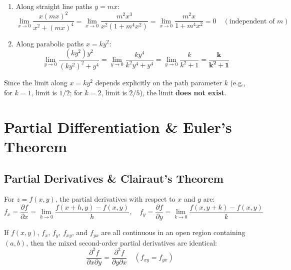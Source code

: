 \begin{solutionbox}
\begin{enumerate}
    \item Along straight line paths $y = mx$:
    \begin{equation*}
        \lim_{x\to 0} \frac{x (mx)^2}{x^2 + (mx)^4} = \lim_{x\to 0} \frac{m^2 x^3}{x^2(1 + m^4 x^2)} = \lim_{x\to 0} \frac{m^2 x}{1 + m^4 x^2} = 0 \quad (\text{independent of } m)
    \end{equation*}
    \item Along parabolic paths $x = k y^2$:
    \begin{equation*}
        \lim_{y\to 0} \frac{(ky^2)y^2}{(ky^2)^2 + y^4} = \lim_{y\to 0} \frac{k y^4}{k^2 y^4 + y^4} = \lim_{y\to 0} \frac{k}{k^2 + 1} = \mathbf{\frac{k}{k^2 + 1}}
    \end{equation*}
\end{enumerate}
Since the limit along $x = ky^2$ depends explicitly on the path parameter $k$ (e.g., for $k=1$, limit is $1/2$; for $k=2$, limit is $2/5$), the limit \textbf{does not exist}.
\end{solutionbox}

\section{Partial Differentiation \& Euler's Theorem}

\subsection{Partial Derivatives \& Clairaut's Theorem}

\begin{definition}
For $z = f(x,y)$, the partial derivatives with respect to $x$ and $y$ are:
\begin{equation}
    f_x = \frac{\partial f}{\partial x} = \lim_{h\to 0} \frac{f(x+h,y) - f(x,y)}{h}, \quad f_y = \frac{\partial f}{\partial y} = \lim_{k\to 0} \frac{f(x,y+k) - f(x,y)}{k}
\end{equation}
\end{definition}

\begin{theorem}
If $f(x,y)$, $f_x$, $f_y$, $f_{xy}$, and $f_{yx}$ are all continuous in an open region containing $(a,b)$, then the mixed second-order partial derivatives are identical:
\begin{equation}
    \frac{\partial^2 f}{\partial x \partial y} = \frac{\partial^2 f}{\partial y \partial x} \quad (f_{xy} = f_{yx})
\end{equation}
\end{theorem}

